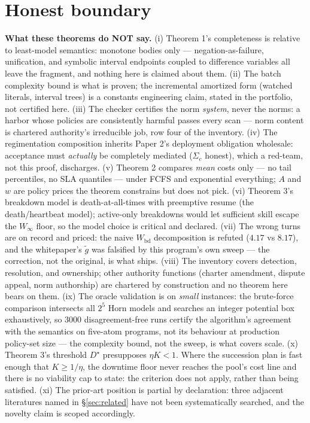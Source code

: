 \documentclass[11pt,a4paper]{article}
\begin{document}
\section{Honest boundary}\label{sec:boundary}
\begin{boundary}
\textbf{What these theorems do NOT say.} (i) Theorem 1's completeness is relative to least-model semantics: monotone bodies only
--- negation-as-failure, unification, and symbolic interval endpoints coupled to difference variables all leave the fragment, and
nothing here is claimed about them. (ii) The batch complexity bound is what is proven; the incremental amortized form (watched
literals, interval trees) is a constants engineering claim, stated in the portfolio, not certified here. (iii) The checker
certifies the norm \emph{system}, never the norms: a harbor whose policies are consistently harmful passes every scan --- norm
content is chartered authority's irreducible job, row four of the inventory. (iv) The regimentation composition inherits Paper
2's deployment obligation wholesale: acceptance must \emph{actually} be completely mediated ($\Sigma_c$ honest), which a
red-team, not this proof, discharges. (v) Theorem 2 compares \emph{mean} costs only --- no tail percentiles, no SLA quantiles ---
under FCFS and exponential everything; $A$ and $w$ are policy prices the theorem constrains but does not pick. (vi) Theorem 3's
breakdown model is death-at-all-times with preemptive resume (the death/heartbeat model); active-only breakdowns would let
sufficient skill escape the $W_\infty$ floor, so the model choice is critical and declared. (vii) The wrong turns are on
record and priced: the naive $W_{\mathrm{bd}}$ decomposition is refuted ($4.17$ vs $8.17$), and the whitepaper's $\tilde g$ was
falsified by this program's own sweep --- the correction, not the original, is what ships. (viii) The inventory covers detection,
resolution, and ownership; other authority functions (charter amendment, dispute appeal, norm authorship) are chartered by
construction and no theorem here bears on them. (ix) The oracle validation is on \emph{small} instances: the brute-force
comparison intersects all $2^5$ Horn models and searches an integer potential box exhaustively, so 3000 disagreement-free runs
certify the algorithm's agreement with the semantics on five-atom programs, not its behaviour at production policy-set size ---
the complexity bound, not the sweep, is what covers scale. (x) Theorem 3's threshold $D^\star$ presupposes $\eta K < 1$. Where
the succession plan is fast enough that $K \ge 1/\eta$, the downtime floor never reaches the pool's cost line and there is no
viability cap to state: the criterion does not apply, rather than being satisfied. (xi) The prior-art position is partial by
declaration: three adjacent literatures named in \S\ref{sec:related} have not been systematically searched, and the novelty
claim is scoped accordingly.
\end{boundary}
\end{document}
